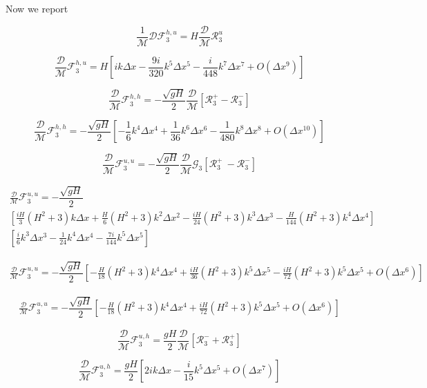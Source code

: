 \documentclass[12pt]{article}
\begin{document}
Now we report

\[ \frac{1}{\mathcal{M}}\mathcal{D}\mathcal{F}_3^{h,u} = H\frac{\mathcal{D}}{\mathcal{M}}\mathcal{R}_3^u\]

\[\frac{\mathcal{D}}{\mathcal{M}}\mathcal{F}_3^{h,u} = H\left[i k \Delta x - \frac{9i}{320} k^5 \Delta x^5 - \frac{i}{448 }k^7 \Delta x ^7 + O(\Delta x ^9) \right]\]

\[\frac{\mathcal{D}}{\mathcal{M}}\mathcal{F}_3^{h,h} = -\dfrac{ \sqrt{gH}}{ 2}  \frac{\mathcal{D}}{\mathcal{M}}\left [ \mathcal{R}_3^+- \mathcal{R}_3^- \right ]\]

\[\frac{\mathcal{D}}{\mathcal{M}}\mathcal{F}_3^{h,h} = -\dfrac{ \sqrt{gH}}{ 2}  \left[ -\frac{1}{6} k^4 \Delta x^4 + \frac{1}{36}k^6 \Delta x^6 - \frac{1}{480}k^8 \Delta x^8 + O(\Delta x ^{10}) \right]\]


\[\frac{\mathcal{D}}{\mathcal{M}}\mathcal{F}_3^{u,u} = - \dfrac{ \sqrt{gH}}{ 2} \frac{\mathcal{D}}{\mathcal{M}}\mathcal{G}_3 \left [ \mathcal{R}_3^+ \ -  \mathcal{R}_3^-  \right]\]

\begin{multline}
\frac{\mathcal{D}}{\mathcal{M}}\mathcal{F}_3^{u,u} = - \dfrac{ \sqrt{gH}}{ 2} \\\left[ \frac{iH}{3} (H^2 + 3) k \Delta x + \frac{H}{6} (H^2 + 3) k^2 \Delta x^2 -\frac{iH}{24} (H^2 + 3) k^3 \Delta x^3 -  \frac{H}{144} (H^2 + 3) k^4 \Delta x^4  \right] \\ 
\left[\frac{i}{6} k^3 \Delta x^3 - \frac{1}{24} k^4 \Delta x^4 - \frac{7i}{144} k^5 \Delta x^5\right]
\end{multline}

\begin{multline}
\frac{\mathcal{D}}{\mathcal{M}}\mathcal{F}_3^{u,u} = - \dfrac{ \sqrt{gH}}{ 2} \left [-\frac{H}{18}(H^2 + 3) k^4 \Delta x^4 + \frac{iH}{36}(H^2 + 3) k^5 \Delta x^5  - \frac{iH}{72} (H^2 + 3) k^5 \Delta x^5  + O(\Delta x^6) \right]
\end{multline}

\begin{multline}
\frac{\mathcal{D}}{\mathcal{M}}\mathcal{F}_3^{u,u} = - \dfrac{ \sqrt{gH}}{ 2} \left [-\frac{H}{18}(H^2 + 3) k^4 \Delta x^4 + \frac{iH}{72}(H^2 + 3) k^5 \Delta x^5  + O(\Delta x^6) \right]
\end{multline}


\[\frac{\mathcal{D}}{\mathcal{M}}\mathcal{F}_3^{u,h} = \dfrac{ gH}{ 2}\frac{\mathcal{D}}{\mathcal{M}} [\mathcal{R}_3^- + \mathcal{R}_3^+] \]

\[\frac{\mathcal{D}}{\mathcal{M}}\mathcal{F}_3^{u,h} = \dfrac{ gH}{ 2} \left[2i k \Delta x - \frac{i }{15} k^5\Delta x ^5 + O(\Delta x ^7)\right] \]
\end{document}
